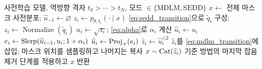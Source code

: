 \begin{algorithm}[t]
\caption{MDLM 또는 SEDD를 위한 측지 모멘텀 샘플링}
\label{alg:gms}
\begin{algorithmic}[1]
\Require 사전학습 모델, 역방향 격자 $t_0>\cdots>t_N$, 모드 $\in\{\mathrm{MDLM},\mathrm{SEDD}\}$
\State $x\gets$ 전체 마스크 사전분포; $\widehat u_{-1}\gets\varnothing$
    \State $z_i\gets p_{\theta,t_i}(\cdot\mid x)$
  \Else
    \State \cref{eq:sedd_transition}으로 $\widetilde q_i$ 구성;
    $z_i\gets\operatorname{Normalize}(\widetilde q_i)$
  \EndIf
  \State $u_i\gets\sqrt{z_i}$; \cref{eq:alpha}로 $\alpha_i$ 계산
    \State $\widehat u_i\gets u_i$
  \Else
    \State $e_i\gets\operatorname{Slerp}(\widehat u_{i-1},u_i;1+\alpha_i)$
    \State $\widehat u_i\gets\operatorname{Proj}_{+}(e_i)$
  \EndIf
  \State $\widehat z_i\gets\widehat u_i^{\odot2}$
    \State $\widehat z_i$를 \cref{eq:mdlm_transition}에 삽입; 마스크 위치를 샘플링하고 나머지는 복사
  \Else
    \State $x\sim\operatorname{Cat}(\widehat z_i)$
  \EndIf
\EndFor
\State 기준 방법의 마지막 잡음 제거 단계를 적용하고 $x$ 반환
\end{algorithmic}
\end{algorithm}
